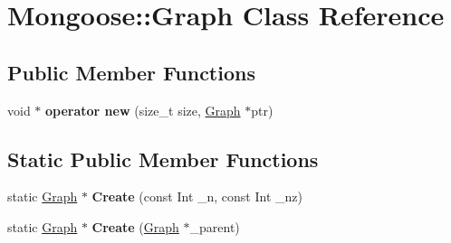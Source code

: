 \hypertarget{class_mongoose_1_1_graph}{}\section{Mongoose\+:\+:Graph Class Reference}
\label{class_mongoose_1_1_graph}
\subsection*{Public Member Functions}
\begin{DoxyCompactItemize}
\item 
void $\ast$ {\bfseries operator new} (size\+\_\+t size, \hyperlink{class_mongoose_1_1_graph}{Graph} $\ast$ptr)\hypertarget{class_mongoose_1_1_graph_a1537d97a9f07d3ebd180858e0423d9ac}{}\label{class_mongoose_1_1_graph_a1537d97a9f07d3ebd180858e0423d9ac}

\end{DoxyCompactItemize}
\subsection*{Static Public Member Functions}
\begin{DoxyCompactItemize}
\item 
static \hyperlink{class_mongoose_1_1_graph}{Graph} $\ast$ {\bfseries Create} (const Int \+\_\+n, const Int \+\_\+nz)\hypertarget{class_mongoose_1_1_graph_a9a5866d6b7a5a000535e1d8b2cc086ee}{}\label{class_mongoose_1_1_graph_a9a5866d6b7a5a000535e1d8b2cc086ee}

\item 
static \hyperlink{class_mongoose_1_1_graph}{Graph} $\ast$ {\bfseries Create} (\hyperlink{class_mongoose_1_1_graph}{Graph} $\ast$\+\_\+parent)\hypertarget{class_mongoose_1_1_graph_a14c7311df4522a4d0730cd87fee6eb2b}{}\label{class_mongoose_1_1_graph_a14c7311df4522a4d0730cd87fee6eb2b}

\end{DoxyCompactItemize}
